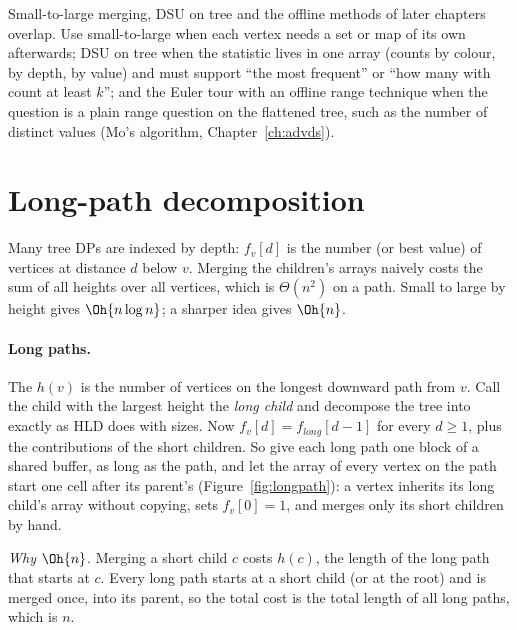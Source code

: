 \begin{tip}
Small-to-large merging, DSU on tree and the offline methods of later chapters overlap. Use small-to-large when each vertex needs a
set or map of its own afterwards; DSU on tree when the statistic lives in one array (counts by colour, by depth, by value) and
must support ``the most frequent'' or ``how many with count at least $k$''; and the Euler tour with an offline range technique when
the question is a plain range question on the flattened tree, such as the number of distinct values (Mo's algorithm,
Chapter~\ref{ch:advds}).
\end{tip}

\section[Long-path decomposition]{Long-path decomposition \hfill \plat}\label{sec:longpath}

Many tree DPs are indexed by depth: $f_v[d]$ is the number (or best value) of vertices at distance $d$ below $v$. Merging the
children's arrays naively costs the sum of all heights over all vertices, which is $\Theta(n^2)$ on a path. Small to large by
height gives $\Oh{n \log n}$; a sharper idea gives $\Oh{n}$.

\paragraph{Long paths.} The  $h(v)$ is the number of vertices on the longest downward path from $v$. Call the child
with the largest height the \emph{long child} and decompose the tree into  exactly as HLD does with sizes. Now
$f_v[d] = f_{\mathit{long}}[d - 1]$ for every $d \ge 1$, plus the contributions of the short children. So give each long path one
block of a shared buffer, as long as the path, and let the array of every vertex on the path start one cell after its parent's
(Figure~\ref{fig:longpath}): a vertex inherits its long child's array without copying, sets $f_v[0] = 1$, and merges only its short
children by hand.

\emph{Why $\Oh{n}$.} Merging a short child $c$ costs $h(c)$, the length of the long path that starts at $c$. Every long path
starts at a short child (or at the root) and is merged once, into its parent, so the total cost is the total length of all long
paths, which is $n$.


